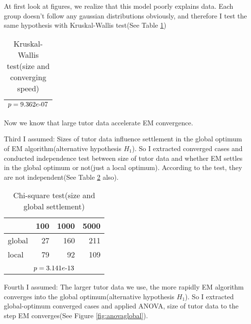 \documentclass[uplatex]{jsarticle}
\newcommand{\mathhyphen}{\mathchar`-}
\begin{document}
	At first look at figures, we realize that this model poorly explains data. Each group doesn't follow any gaussian distributions obviously, and therefore I test the same hypothesis with Kruskal-Wallis test(See Table \ref{tab:SandS})
	\begin{table}[h]
	  \centering
	  \caption{Kruskal-Wallis test(size and converging speed)}
	  \begin{tabular}{c}
	    \hline \hline
	    $p = 9.362e\mathhyphen 07$
	    \\ \hline \hline
	  \end{tabular}
	  \label{tab:SandS}
	\end{table}
	Now we know that large tutor data accelerate EM convergence.
      \par
      \indent
	Third I assumed: Sizes of tutor data influence settlement in the global optimum of EM algorithm(alternative hypothesis $H_1$). So I extracted converged cases and conducted independence test between size of tutor data and whether EM settles in the global optimum or not(just a local optimum). According to the test, they are not independent(See Table \ref{tab:SandG} also).
	\begin{table}[h]
	  \centering
	  \caption{Chi-square test(size and global settlement)}
	  \begin{tabular}{lrrr}
	    \hline
	    & 100 & 1000 & 5000
	    \\ \hline
	    global & 27 & 160 & 211
	    \\
	    local & 79 & 92 & 109
	    \\ \hline
	    \rule{0pt}{1em}
	    \\ \hline \hline
	    \multicolumn{4}{c}{$p = 3.141e\mathhyphen 13$}
	    \\ \hline \hline
	  \end{tabular}
	  \label{tab:SandG}
	\end{table}
      \par
      \indent
	Fourth I assumed: The larger tutor data we use, the more rapidly EM algorithm converges into the global optimum(alternative hypothesis $H_1$). So I extracted global-optimum converged cases and applied ANOVA, size of tutor data to the step EM converges(See Figure \ref{fig:anovaglobal}).
\end{document}
